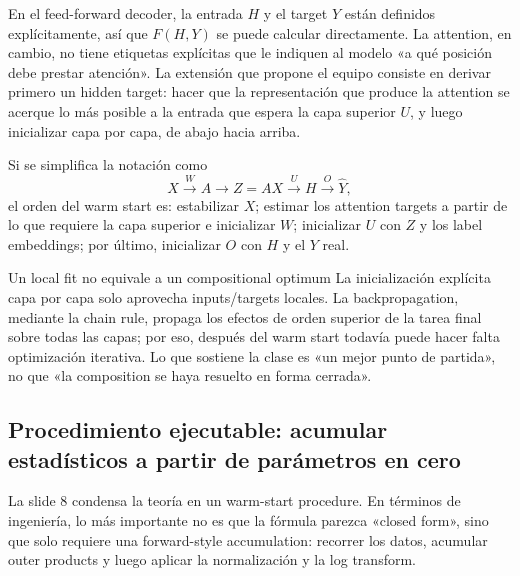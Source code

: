 En el feed-forward decoder, la entrada $H$ y el target $Y$ están definidos explícitamente, así que $F(H,Y)$ se puede calcular directamente. La attention, en cambio, no tiene etiquetas explícitas que le indiquen al modelo «a qué posición debe prestar atención». La extensión que propone el equipo consiste en derivar primero un hidden target: hacer que la representación que produce la attention se acerque lo más posible a la entrada que espera la capa superior $U$, y luego inicializar capa por capa, de abajo hacia arriba.

Si se simplifica la notación como
\[
X\xrightarrow{W} A\xrightarrow{} Z=AX
\xrightarrow{U} H\xrightarrow{O}\hat Y,
\]
el orden del warm start es: estabilizar $X$; estimar los attention targets a partir de lo que requiere la capa superior e inicializar $W$; inicializar $U$ con $Z$ y los label embeddings; por último, inicializar $O$ con $H$ y el $Y$ real.

\begin{warningbox}{Un local fit no equivale a un compositional optimum}
La inicialización explícita capa por capa solo aprovecha inputs/targets locales. La backpropagation, mediante la chain rule, propaga los efectos de orden superior de la tarea final sobre todas las capas; por eso, después del warm start todavía puede hacer falta optimización iterativa. Lo que sostiene la clase es «un mejor punto de partida», no que «la composition se haya resuelto en forma cerrada».
\end{warningbox}


\subsection{Procedimiento ejecutable: acumular estadísticos a partir de parámetros en cero}

La slide 8 condensa la teoría en un warm-start procedure. En términos de ingeniería, lo más importante no es que la fórmula parezca «closed form», sino que solo requiere una forward-style accumulation: recorrer los datos, acumular outer products y luego aplicar la normalización y la log transform.


